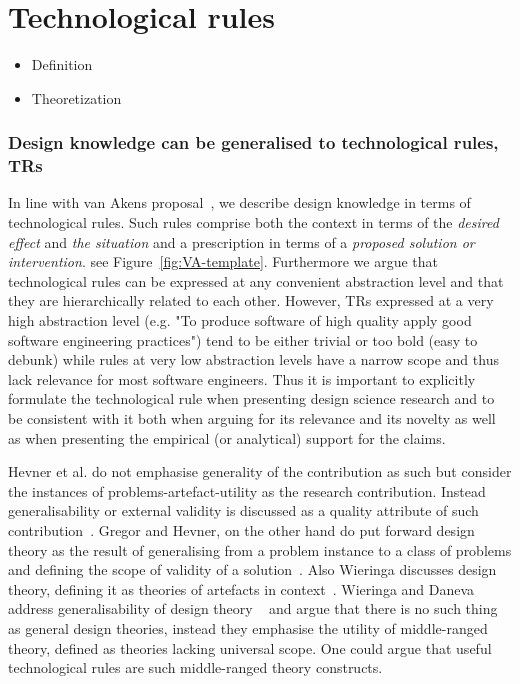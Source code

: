 \documentclass[graybox]{svmult}
\begin{document}
\section{Technological rules}
\begin{itemize}
\item Definition
\item Theoretization
\end{itemize}

\subsubsection{Design knowledge can be generalised to technological rules, TRs}
In line with van Akens proposal~\cite{van_aken_management_2004}, we describe design knowledge in terms of technological rules. Such rules comprise both the context in terms of the \emph{desired effect} and \emph{the situation} and a prescription in terms of a \emph{proposed solution or intervention}. see Figure~\ref{fig:VA-template}. Furthermore we argue that technological rules can be expressed at any convenient abstraction level and that they are hierarchically related to each other. However, TRs expressed at a very high abstraction level (e.g. "To produce software of high quality apply good software engineering practices") tend to be either trivial or too bold (easy to debunk) while rules at very low abstraction levels have a narrow scope and thus lack relevance for most software engineers. Thus it is important to explicitly formulate the technological rule when presenting design science research and to be consistent with it both when arguing for its relevance and its novelty as well as when presenting the empirical (or analytical) support for the claims. 

Hevner et al. do not emphasise generality of the contribution as such but consider the instances of problems-artefact-utility as the research contribution. Instead generalisability or external validity is discussed as a quality attribute of such contribution~\cite{hevner_design_2004}. Gregor and Hevner, on the other hand do put forward design theory as the result of generalising from a problem instance to a class of problems and defining the scope of validity of a solution~\cite{gregor_positioning_2013}. Also Wieringa discusses design theory, defining it as theories of artefacts in context~\cite{wieringa_design_2009}. Wieringa and Daneva address generalisability of design theory ~\cite{wieringa_six_2015} and argue that there is no such thing as general design theories, instead they emphasise the utility of middle-ranged theory, defined as theories lacking universal scope. One could argue that useful technological rules are such middle-ranged theory constructs.
\end{document}
